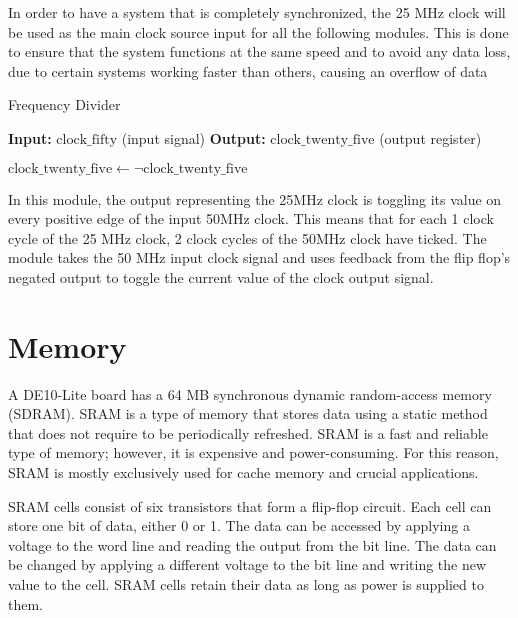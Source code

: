 \par In order to have a system that is completely synchronized, the 25 MHz clock will be used as the main clock source input for all the following modules. This is done to ensure that the system functions at the same speed and to avoid any data loss, due to certain systems working faster than others, causing an overflow of data \newline

\begin{algorithm}[H]
\caption{Frequency Divider \cite{fpgaipvgarepo}}
\begin{algorithmic}
    \State \textbf{Input:} $\text{clock\_fifty}$ (input signal)
    \State \textbf{Output:} $\text{clock\_twenty\_five}$ (output register)

     
            \State $\text{clock\_twenty\_five} \gets \neg \text{clock\_twenty\_five}$ 
        \EndIf
    \EndWhile
\EndProcedure
\end{algorithmic}
\end{algorithm}

\par In this module, the output representing the 25MHz clock is toggling its value on every positive edge of the input 50MHz clock. This means that for each 1 clock cycle of the 25 MHz clock, 2 clock cycles of the 50MHz clock have ticked. The module takes the 50 MHz input clock signal and uses feedback from the flip flop's negated output to toggle the current value of the clock output signal.  \newline

\section{Memory}
\par A DE10-Lite board has a 64 MB synchronous dynamic random-access memory (SDRAM). SRAM is a type of memory that stores data using a static method that does not require to be periodically refreshed. SRAM is a fast and reliable type of memory; however, it is expensive and power-consuming. For this reason, SRAM is mostly exclusively used for cache memory and crucial applications. \newline
\par SRAM cells consist of six transistors that form a flip-flop circuit. Each cell can store one bit of data, either 0 or 1. The data can be accessed by applying a voltage to the word line and reading the output from the bit line. The data can be changed by applying a different voltage to the bit line and writing the new value to the cell. SRAM cells retain their data as long as power is supplied to them. \newline

